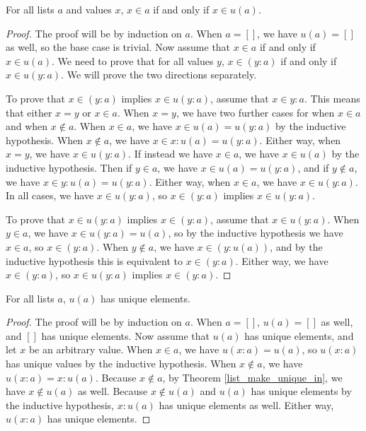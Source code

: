 \documentclass[../../math.tex]{subfiles}
\begin{document}
\begin{theorem} \label{list_make_unique_in}
    For all lists $a$ and values $x$, $x \in a$ if and only if $x \in u(a)$.
\end{theorem}
\begin{proof}
    The proof will be by induction on $a$.  When $a = []$, we have $u(a) = []$
    as well, so the base case is trivial.  Now assume that $x \in a$ if and only
    if $x \in u(a)$.  We need to prove that for all values $y$, $x \in (y : a)$
    if and only if $x \in u(y : a)$.  We will prove the two directions
    separately.

    To prove that $x \in (y : a)$ implies $x \in u(y : a)$, assume that $x \in y
    : a$.  This means that either $x = y$ or $x \in a$.  When $x = y$, we have
    two further cases for when $x \in a$ and when $x \notin a$.  When $x \in a$,
    we have $x \in u(a) = u(y : a)$ by the inductive hypothesis.  When $x \notin
    a$, we have $x \in x : u(a) = u(y : a)$.  Either way, when $x = y$, we have
    $x \in u(y : a)$.  If instead we have $x \in a$, we have $x \in u(a)$ by the
    inductive hypothesis.  Then if $y \in a$, we have $x \in u(a) = u(y : a)$,
    and if $y \notin a$, we have $x \in y : u(a) = u(y : a)$.  Either way, when
    $x \in a$, we have $x \in u(y : a)$.  In all cases, we have $x \in u(y :
    a)$, so $x \in (y : a)$ implies $x \in u(y : a)$.

    To prove that $x \in u(y : a)$ implies $x \in (y : a)$, assume that $x \in
    u(y : a)$.  When $y \in a$, we have $x \in u(y : a) = u(a)$, so by the
    inductive hypothesis we have $x \in a$, so $x \in (y : a)$.  When $y \notin
    a$, we have $x \in (y : u(a))$, and by the inductive hypothesis this is
    equivalent to $x \in (y : a)$.  Either way, we have $x \in (y : a)$, so $x
    \in u(y : a)$ implies $x \in (y : a)$.
\end{proof}

\begin{theorem} \label{list_make_unique_unique}
    For all lists $a$, $u(a)$ has unique elements.
\end{theorem}
\begin{proof}
    The proof will be by induction on $a$.  When $a = []$, $u(a) = []$ as well,
    and $[]$ has unique elements.  Now assume that $u(a)$ has unique elements,
    and let $x$ be an arbitrary value.  When $x \in a$, we have $u(x : a) =
    u(a)$, so $u(x : a)$ has unique values by the inductive hypothesis.  When $x
    \notin a$, we have $u(x : a) = x : u(a)$.  Because $x \notin a$, by Theorem
    \ref{list_make_unique_in}, we have $x \notin u(a)$ as well.  Because $x
    \notin u(a)$ and $u(a)$ has unique elements by the inductive hypothesis, $x
    : u(a)$ has unique elements as well.  Either way, $u(x : a)$ has unique
    elements.
\end{proof}
\end{document}
